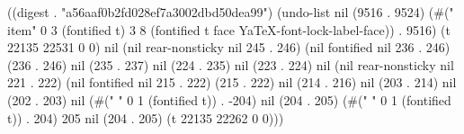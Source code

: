 
((digest . "a56aaf0b2fd028ef7a3002dbd50dea99") (undo-list nil (9516 . 9524) (#("
  \\item" 0 3 (fontified t) 3 8 (fontified t face YaTeX-font-lock-label-face)) . 9516) (t 22135 22531 0 0) nil (nil rear-nonsticky nil 245 . 246) (nil fontified nil 236 . 246) (236 . 246) nil (235 . 237) nil (224 . 235) nil (223 . 224) nil (nil rear-nonsticky nil 221 . 222) (nil fontified nil 215 . 222) (215 . 222) nil (214 . 216) nil (203 . 214) nil (202 . 203) nil (#("
" 0 1 (fontified t)) . -204) nil (204 . 205) (#(" " 0 1 (fontified t)) . 204) 205 nil (204 . 205) (t 22135 22262 0 0)))
